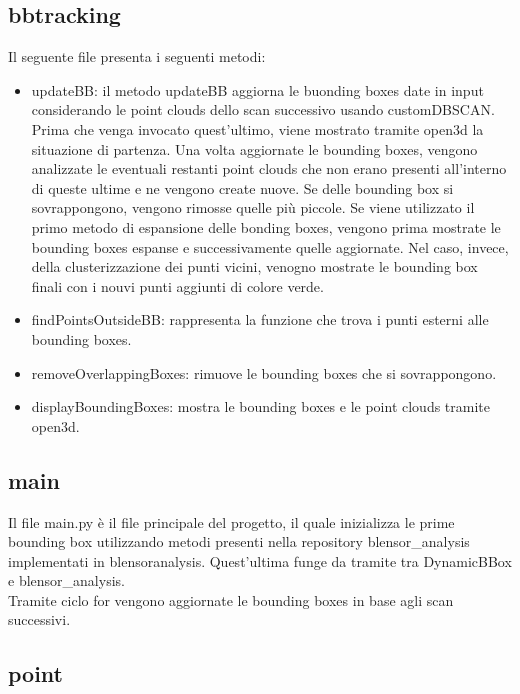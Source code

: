 \documentclass[italian]{article}
\begin{document}
\subsection{bbtracking}
Il seguente file presenta i seguenti metodi:
\begin{itemize}
	\item updateBB: il metodo updateBB aggiorna le buonding boxes date in input considerando le point clouds dello scan successivo usando customDBSCAN. Prima che venga invocato quest'ultimo, viene mostrato tramite open3d la situazione di partenza. Una volta aggiornate le bounding boxes, vengono analizzate le eventuali restanti point clouds che non erano presenti all'interno di queste ultime e ne vengono create nuove. Se delle bounding box si sovrappongono, vengono rimosse quelle più piccole. Se viene utilizzato il primo metodo di espansione delle bonding boxes, vengono prima mostrate le bounding boxes espanse e successivamente quelle aggiornate. Nel caso, invece, della clusterizzazione dei punti vicini, venogno mostrate le bounding box finali con i nouvi punti aggiunti di colore verde.
	\item findPointsOutsideBB: rappresenta la funzione che trova i punti esterni alle bounding boxes.
	\item removeOverlappingBoxes: rimuove le bounding boxes che si sovrappongono.
	\item displayBoundingBoxes: mostra le bounding boxes e le point clouds tramite open3d.
\end{itemize}
\subsection{main}
Il file main.py è il file principale del progetto, il quale inizializza le prime bounding box utilizzando metodi presenti nella repository blensor\_analysis implementati in blensoranalysis. Quest'ultima funge da tramite tra DynamicBBox e blensor\_analysis.\\
Tramite ciclo for vengono aggiornate le bounding boxes in base agli scan successivi.
\subsection{point}
\end{document}
